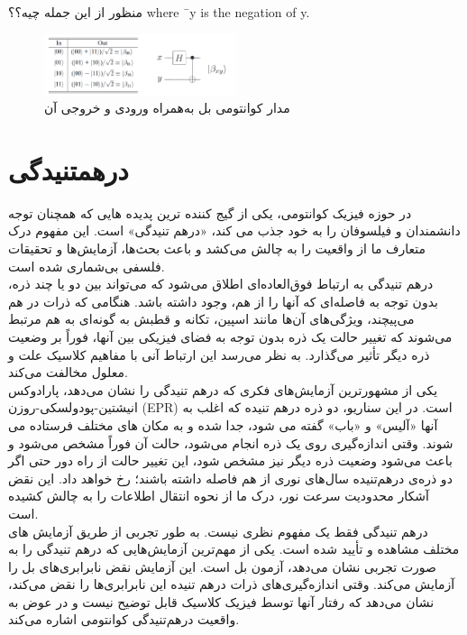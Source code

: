 \documentclass{book}
\begin{document}
منظور از این جمله چیه؟؟
where ¯y is the negation of y.




 
\begin{figure}[h]
	\centering
	\includegraphics[width=0.5\textwidth]{Bell_state.png}
	\caption{مدار کوانتومی بل به‌همراه ورودی و خروجی آن}
\end{figure}

\section{درهمتنیدگی}
در حوزه فیزیک کوانتومی، یکی از گیج کننده ترین پدیده هایی که همچنان توجه دانشمندان و فیلسوفان را به خود جذب می کند، «درهم تنیدگی» است. این مفهوم درک متعارف ما از واقعیت را به چالش می‌کشد و باعث بحث‌ها، آزمایش‌ها و تحقیقات فلسفی بی‌شماری شده است.\\
درهم تنیدگی به ارتباط فوق‌العاده‌ای اطلاق می‌شود که می‌تواند بین دو یا چند ذره، بدون توجه به فاصله‌ای که آنها را از هم، وجود داشته باشد. هنگامی که ذرات در هم می‌پیچند، ویژگی‌های آن‌ها مانند اسپین، تکانه و قطبش به گونه‌ای به هم مرتبط می‌شوند که تغییر حالت یک ذره بدون توجه به فضای فیزیکی بین آنها، فوراً بر وضعیت ذره دیگر تأثیر می‌گذارد. به نظر می‌رسد این ارتباط آنی با مفاهیم کلاسیک علت و معلول مخالفت می‌کند.\\

یکی از مشهورترین آزمایش‌های فکری که درهم تنیدگی را نشان می‌دهد، پارادوکس انیشتین-پودولسکی-روزن (EPR) است. در این سناریو، دو ذره درهم تنیده که اغلب به آنها «آلیس» و «باب» گفته می شود، جدا شده و به مکان های مختلف فرستاده می شوند. وقتی اندازه‌گیری روی یک ذره انجام می‌شود، حالت آن فوراً مشخص می‌شود و باعث می‌شود وضعیت ذره دیگر نیز مشخص شود، این تغییر حالت از راه دور حتی اگر دو ذره‌ی درهم‌تنیده سال‌های نوری از هم فاصله داشته باشند؛ رخ خواهد داد. این نقض آشکار محدودیت سرعت نور، درک ما از نحوه انتقال اطلاعات را به چالش کشیده است.\\

درهم تنیدگی فقط یک مفهوم نظری نیست. به طور تجربی از طریق آزمایش های مختلف مشاهده و تأیید شده است. یکی از مهم‌ترین آزمایش‌هایی که درهم تنیدگی را به صورت تجربی نشان می‌دهد، آزمون بل است.
این آزمایش نقض نابرابری‌های بل را آزمایش می‌کند. وقتی اندازه‌گیری‌های ذرات درهم تنیده این نابرابری‌ها را نقض می‌کند، نشان می‌دهد که رفتار آنها توسط فیزیک کلاسیک قابل توضیح نیست و در عوض به واقعیت درهم‌تنیدگی کوانتومی اشاره می‌کند.\\
\end{document}
